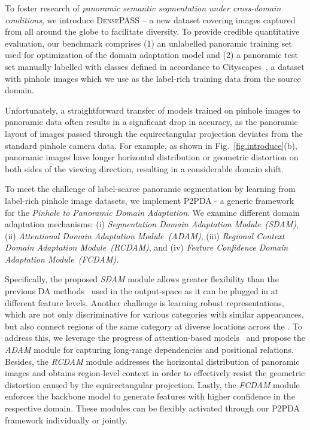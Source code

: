\documentclass[journal]{IEEEtran}
\begin{document}
To foster research of \emph{panoramic semantic segmentation under cross-domain conditions}, we introduce \textsc{DensePASS} -- a new dataset covering  images captured from all around the globe to facilitate diversity.
To provide credible quantitative evaluation, our benchmark comprises (1) an unlabelled panoramic training set used for optimization of the domain adaptation model and (2) a panoramic test set manually labelled with  classes defined in accordance to Cityscapes~\cite{cityscapes}, a dataset with pinhole images which we use as the label-rich training data from the source domain. 

Unfortunately, a straightforward transfer of models trained on pinhole images to panoramic data often results in a significant drop in accuracy, as the panoramic layout of images passed through the equirectangular projection deviates from the standard pinhole camera data.
For example, as shown in Fig.~\ref{fig.introduce}(b), panoramic images have longer horizontal distribution or geometric distortion on both sides of the viewing direction, resulting in a considerable domain shift.

To meet the challenge of label-scarce panoramic segmentation by learning from label-rich pinhole image datasets, we implement P2PDA - a generic framework for the \emph{Pinhole to Panoramic Domain Adaptation}.
We examine different domain adaptation mechanisms: (i) \emph{Segmentation Domain Adaptation Module~(SDAM)}, (ii) \emph{Attentional Domain Adaptation Module~(ADAM)}, (iii) \emph{Regional Context Domain Adaptation Module~(RCDAM)}, and (iv) \emph{Feature Confidence Domain Adaptation Module~(FCDAM)}.

Specifically, the proposed \emph{SDAM} module allows greater flexibility than the previous DA methods~\cite{adaptsegnet,all_about_structure} used in the output-space as it can be plugged in at different feature levels.
Another challenge is  learning robust representations, which are not only discriminative for various categories with similar appearances, but also connect regions of the same category at diverse locations across the .
To address this, we leverage the progress of attention-based models~\cite{nonlocal,danet,fanet} and propose the \emph{ADAM} module for capturing long-range dependencies and positional relations.
Besides, the \emph{RCDAM} module addresses the horizontal distribution of panoramic images and obtains region-level context in order to effectively resist the geometric distortion caused by the equirectangular projection. Lastly, the \emph{FCDAM} module enforces the backbone model to generate features with higher confidence in the respective domain.
These modules can be flexibly activated through our P2PDA framework individually or jointly.
\end{document}
